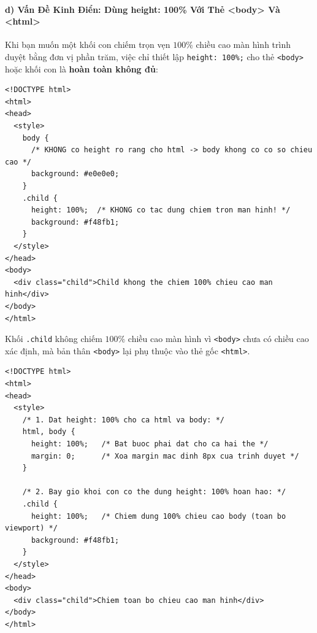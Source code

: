 \documentclass[11pt,oneside]{book}
\newcommand{\codeinline}[1]{\textcolor{accentOrange}{\texttt{#1}}}
\begin{document}
\paragraph{d) Vấn Đề Kinh Điển: Dùng height: 100\% Với Thẻ <body> Và <html>}

Khi bạn muốn một khối con chiếm trọn vẹn $100\%$ chiều cao màn hình trình duyệt bằng đơn vị phần trăm, việc chỉ thiết lập \codeinline{height: 100\%;} cho thẻ \codeinline{<body>} hoặc khối con là \textbf{hoàn toàn không đủ}:

\begin{codeWindow}
\begin{lstlisting}[language=HTML5]
<!DOCTYPE html>
<html>
<head>
  <style>
    body {
      /* KHONG co height ro rang cho html -> body khong co co so chieu cao */
      background: #e0e0e0;
    }
    .child {
      height: 100%;  /* KHONG co tac dung chiem tron man hinh! */
      background: #f48fb1;
    }
  </style>
</head>
<body>
  <div class="child">Child khong the chiem 100% chieu cao man hinh</div>
</body>
</html>
\end{lstlisting}
\end{codeWindow}

\begin{conceptBox}
Khối \codeinline{.child} không chiếm $100\%$ chiều cao màn hình vì \codeinline{<body>} chưa có chiều cao xác định, mà bản thân \codeinline{<body>} lại phụ thuộc vào thẻ gốc \codeinline{<html>}.
\end{conceptBox}

\begin{codeWindow}
\begin{lstlisting}[language=HTML5]
<!DOCTYPE html>
<html>
<head>
  <style>
    /* 1. Dat height: 100% cho ca html va body: */
    html, body {
      height: 100%;   /* Bat buoc phai dat cho ca hai the */
      margin: 0;      /* Xoa margin mac dinh 8px cua trinh duyet */
    }

    /* 2. Bay gio khoi con co the dung height: 100% hoan hao: */
    .child {
      height: 100%;   /* Chiem dung 100% chieu cao body (toan bo viewport) */
      background: #f48fb1;
    }
  </style>
</head>
<body>
  <div class="child">Chiem toan bo chieu cao man hinh</div>
</body>
</html>
\end{lstlisting}
\end{codeWindow}
\end{document}
